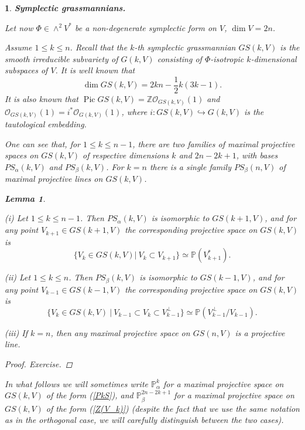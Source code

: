 \documentclass[12pt]{amsart}
\newcommand{\Pic}{\operatorname{Pic}\nolimits}
\newtheorem{lemma}[theorem]{Lemma}
\newtheorem{sub}[subsection]{}
\theoremstyle{definition}
\begin{document}
\begin{sub}{\bf Symplectic grassmannians.}\label{symp ind-grassm}

\rm
Let now $\Phi\in \wedge^2V^*$ be a non-degenerate symplectic form on $V$, $\dim V=2n$.

Assume $1\le k\le n$. Recall that the \textit{$k$-th symplectic grassmannian}  $GS(k,V)$ is the smooth irreducible
subvariety of $G(k,V)$ consisting of $\Phi$-isotropic $k$-dimensional subspaces of $V$.
It is well known that
\begin{equation}\label{dim IIkn}
\dim GS(k,V)=2kn-\frac{1}{2}k(3k-1).
\end{equation}
It is also known that $\Pic GS(k,V)=\mathbb{Z}\mathcal{O}_{GS(k,V)}(1)$ and
$\mathcal{O}_{GS(k,V)}(1)=i^*\mathcal{O}_{G(k,V)}(1)$, where $i:GS(k,V)\hookrightarrow G(k,V)$
is the tautological embedding.



\vspace{2mm}

One can see that, for $1\le k\le n-1$, there are two families of maximal
projective spaces on $GS(k,V)$ of respective dimensions $k$ and $2n-2k+1$, with bases
$PS_{\alpha}(k,V)$ and $PS_{\beta}(k,V)$.
For $k=n$ there is a single family $PS_{\beta}(n,V)$ of maximal projective lines on $GS(k,V)$.
\begin{lemma}\label{Bkn sympl}

(i) Let $1\le k\le n-1$. Then $PS_{\alpha}(k,V)$ is isomorphic to $GS(k+1,V)$, and for any point $V_{k+1}\in GS(k+1,V)$
the corresponding projective space on $GS(k,V)$ is
\begin{equation}\label{PkS}
\{V_k\in GS(k,V)|\ V_k\subset V_{k+1}\}\simeq\mathbb{P}(V_{k+1}^*).
\end{equation}

(ii) Let $1\le k\le n$. Then $PS_{\beta}(k,V)$ is isomorphic to $GS(k-1,V)$, and for any point
$V_{k-1}\in GS(k-1,V)$ the corresponding projective space on $GS(k,V)$ is
\begin{equation}\label{Z(V_k)}
\{V_k\in GS(k,V)\ |\ V_{k-1}\subset V_k\subset V_{k-1}^\bot\}\simeq\mathbb{P}(V_{k-1}^\bot/V_{k-1}).
\end{equation}

(iii) If $k=n$, then any maximal projective space on $GS(n,V)$ is a projective line.
\end{lemma}
\begin{proof} Exercise.
\end{proof}

In what follows we will sometimes write $\mathbb{P}^k_{\alpha}$ for a maximal projective space on $GS(k,V)$ of the form
(\ref{PkS}), and $\mathbb{P}^{2n-2k+1}_{\beta}$ for a maximal projective space on $GS(k,V)$ of the
form (\ref{Z(V_k)}) (despite the fact that we use the same notation as in the orthogonal case,
we will carefully distinguish between the two cases).




\end{sub}
\end{document}

